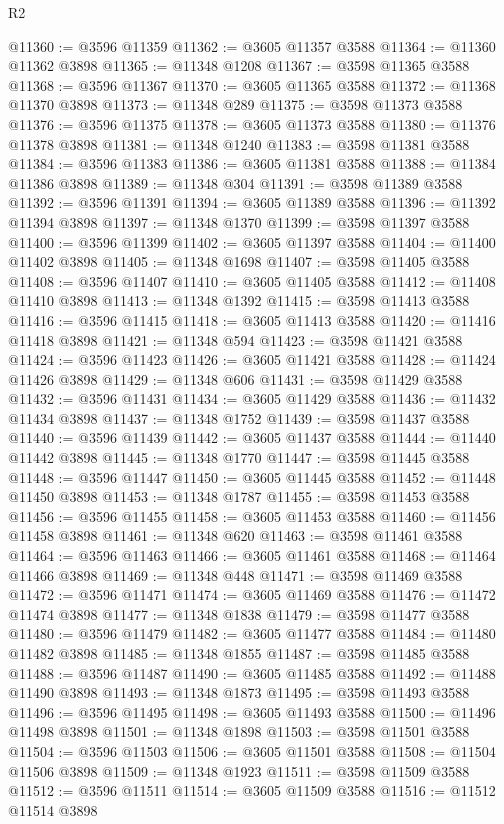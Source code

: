 \begin{lexlean}{R2}
\begin{coremodule}
@11360 := @3596 @11359
@11362 := @3605 @11357 @3588
@11364 := @11360 @11362 @3898
@11365 := @11348 @1208
@11367 := @3598 @11365 @3588
@11368 := @3596 @11367
@11370 := @3605 @11365 @3588
@11372 := @11368 @11370 @3898
@11373 := @11348 @289
@11375 := @3598 @11373 @3588
@11376 := @3596 @11375
@11378 := @3605 @11373 @3588
@11380 := @11376 @11378 @3898
@11381 := @11348 @1240
@11383 := @3598 @11381 @3588
@11384 := @3596 @11383
@11386 := @3605 @11381 @3588
@11388 := @11384 @11386 @3898
@11389 := @11348 @304
@11391 := @3598 @11389 @3588
@11392 := @3596 @11391
@11394 := @3605 @11389 @3588
@11396 := @11392 @11394 @3898
@11397 := @11348 @1370
@11399 := @3598 @11397 @3588
@11400 := @3596 @11399
@11402 := @3605 @11397 @3588
@11404 := @11400 @11402 @3898
@11405 := @11348 @1698
@11407 := @3598 @11405 @3588
@11408 := @3596 @11407
@11410 := @3605 @11405 @3588
@11412 := @11408 @11410 @3898
@11413 := @11348 @1392
@11415 := @3598 @11413 @3588
@11416 := @3596 @11415
@11418 := @3605 @11413 @3588
@11420 := @11416 @11418 @3898
@11421 := @11348 @594
@11423 := @3598 @11421 @3588
@11424 := @3596 @11423
@11426 := @3605 @11421 @3588
@11428 := @11424 @11426 @3898
@11429 := @11348 @606
@11431 := @3598 @11429 @3588
@11432 := @3596 @11431
@11434 := @3605 @11429 @3588
@11436 := @11432 @11434 @3898
@11437 := @11348 @1752
@11439 := @3598 @11437 @3588
@11440 := @3596 @11439
@11442 := @3605 @11437 @3588
@11444 := @11440 @11442 @3898
@11445 := @11348 @1770
@11447 := @3598 @11445 @3588
@11448 := @3596 @11447
@11450 := @3605 @11445 @3588
@11452 := @11448 @11450 @3898
@11453 := @11348 @1787
@11455 := @3598 @11453 @3588
@11456 := @3596 @11455
@11458 := @3605 @11453 @3588
@11460 := @11456 @11458 @3898
@11461 := @11348 @620
@11463 := @3598 @11461 @3588
@11464 := @3596 @11463
@11466 := @3605 @11461 @3588
@11468 := @11464 @11466 @3898
@11469 := @11348 @448
@11471 := @3598 @11469 @3588
@11472 := @3596 @11471
@11474 := @3605 @11469 @3588
@11476 := @11472 @11474 @3898
@11477 := @11348 @1838
@11479 := @3598 @11477 @3588
@11480 := @3596 @11479
@11482 := @3605 @11477 @3588
@11484 := @11480 @11482 @3898
@11485 := @11348 @1855
@11487 := @3598 @11485 @3588
@11488 := @3596 @11487
@11490 := @3605 @11485 @3588
@11492 := @11488 @11490 @3898
@11493 := @11348 @1873
@11495 := @3598 @11493 @3588
@11496 := @3596 @11495
@11498 := @3605 @11493 @3588
@11500 := @11496 @11498 @3898
@11501 := @11348 @1898
@11503 := @3598 @11501 @3588
@11504 := @3596 @11503
@11506 := @3605 @11501 @3588
@11508 := @11504 @11506 @3898
@11509 := @11348 @1923
@11511 := @3598 @11509 @3588
@11512 := @3596 @11511
@11514 := @3605 @11509 @3588
@11516 := @11512 @11514 @3898

\end{coremodule}
\end{lexlean}
